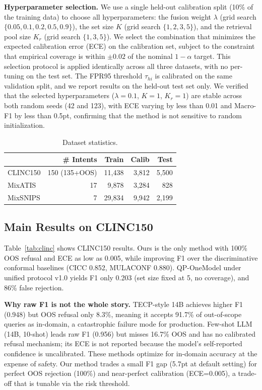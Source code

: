 \documentclass[sigconf, anonymous, review]{acmart}
\begin{document}
\textbf{Hyperparameter selection.} We use a single held-out calibration split (10\% of the training data) to choose all hyperparameters: the fusion weight $\lambda$ (grid search $\{0.05, 0.1, 0.2, 0.5, 0.9\}$), the set size $K$ (grid search $\{1, 2, 3, 5\}$), and the retrieval pool size $K_r$ (grid search $\{1, 3, 5\}$). We select the combination that minimizes the expected calibration error (ECE) on the calibration set, subject to the constraint that empirical coverage is within $\pm 0.02$ of the nominal $1-\alpha$ target. This selection protocol is applied identically across all three datasets, with no per-tuning on the test set. The FPR95 threshold $\tau_{hi}$ is calibrated on the same validation split, and we report results on the held-out test set only. We verified that the selected hyperparameters ($\lambda=0.1$, $K=1$, $K_r=1$) are stable across both random seeds (42 and 123), with ECE varying by less than 0.01 and Macro-F1 by less than 0.5pt, confirming that the method is not sensitive to random initialization.

\begin{table}[t]
\centering\small
\caption{Dataset statistics.}
\label{tab:data}
\begin{tabular}{lrrrr}
\toprule
& \# Intents & Train & Calib & Test \\
\midrule
CLINC150 & 150 (135+OOS) & 11,438 & 3,812 & 5,500 \\
MixATIS & 17 & 9,878 & 3,284 & 828 \\
MixSNIPS & 7 & 29,834 & 9,942 & 2,199 \\
\bottomrule
\end{tabular}
\end{table}

\subsection{Main Results on CLINC150}
Table~\ref{tab:clinc} shows CLINC150 results. Ours is the only method with 100\% OOS refusal and ECE as low as 0.005, while improving F1 over the discriminative conformal baselines (CICC 0.852, MULACONF 0.880). QP-OneModel under unified protocol v1.0 yields F1 only 0.203 (set size fixed at 5, no coverage), and 86\% false rejection.

\textbf{Why raw F1 is not the whole story.} TECP-style 14B achieves higher F1 (0.948) but OOS refusal only 8.3\%, meaning it accepts 91.7\% of out-of-scope queries as in-domain, a catastrophic failure mode for production. Few-shot LLM (14B, 10-shot) leads raw F1 (0.956) but misses 16.7\% OOS and has no calibrated refusal mechanism; its ECE is not reported because the model's self-reported confidence is uncalibrated. These methods optimize for in-domain accuracy at the expense of safety. Our method trades a small F1 gap (5.7pt at default setting) for perfect OOS rejection (100\%) and near-perfect calibration (ECE=0.005), a trade-off that is tunable via the risk threshold.
\end{document}
